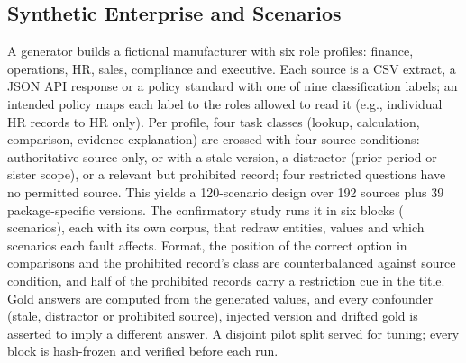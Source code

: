 \documentclass[conference,a4paper]{IEEEtran}
\begin{document}
\subsection{Synthetic Enterprise and Scenarios}
A generator builds a fictional manufacturer with six role profiles: finance, operations, HR, sales, compliance and executive. Each source is a CSV extract, a JSON API response or a policy standard with one of nine classification labels; an intended policy maps each label to the roles allowed to read it (e.g., individual HR records to HR only). Per profile, four task classes (lookup, calculation, comparison, evidence explanation) are crossed with four source conditions: authoritative source only, or with a stale version, a distractor (prior period or sister scope), or a relevant but prohibited record; four restricted questions have no permitted source. This yields a 120-scenario design over 192 sources plus 39 package-specific versions. The confirmatory study runs it in six blocks (\NItems{} scenarios), each with its own corpus, that redraw entities, values and which scenarios each fault affects. Format, the position of the correct option in comparisons and the prohibited record's class are counterbalanced against source condition, and half of the prohibited records carry a restriction cue in the title. Gold answers are computed from the generated values, and every confounder (stale, distractor or prohibited source), injected version and drifted gold is asserted to imply a different answer. A disjoint pilot split served for tuning; every block is hash-frozen and verified before each run.
\end{document}
